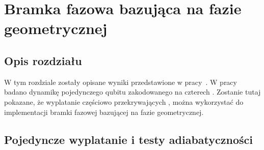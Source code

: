 \chapter{Bramka fazowa bazująca na fazie geometrycznej}
\label{chap:phaseGate}

\section*{Opis rozdziału}

W tym rozdziale zostały opisane wyniki przedstawione w pracy~\cite{wieckowski.mierzejewski.2020}.
W pracy badano dynamikę pojedynczego qubitu zakodowanego na czterech \MZM.
Zostanie tutaj pokazane, że wyplatanie częściowo przekrywających \MZM, można wykorzystać do implementacji bramki fazowej bazującej na fazie geometrycznej.

\section{Pojedyncze wyplatanie i testy adiabatyczności}

